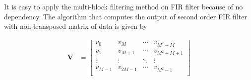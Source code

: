 It is easy to apply the multi-block filtering method on FIR filter 
because of no dependency. The algorithm that computes the output of second order FIR filter 
with non-transposed matrix of data is given by

\begin{equation}
    \label{eq:FIR_block_filtering_wo_trans}
    \begin{aligned}
        \bm{V} &= \left[\begin{array}{c|c|c|c}
            v_0 & v_M & \cdots & v_{M^2-M} \\ 
            v_1 & v_{M+1} & \cdots & v_{M^2-M+1} \\
            \vdots & \vdots & \ddots & \vdots \\
            v_{M-1} & v_{2M-1} &\cdots & v_{M^2-1} \\
            \end{array}\right] \\

\end{aligned}
\end{equation}
